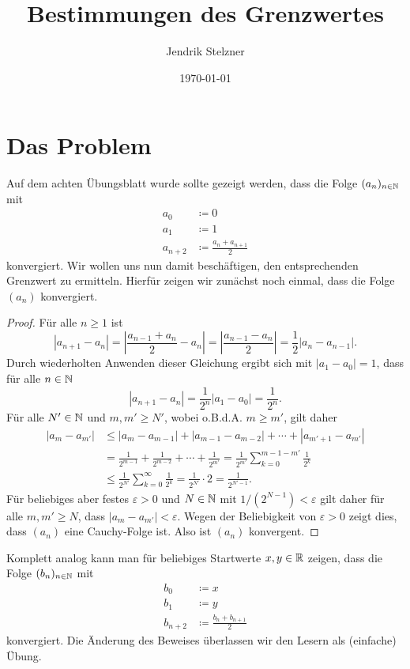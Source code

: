 \documentclass[a4paper,10pt]{article}
\title{Bestimmungen des Grenzwertes}
\author{Jendrik Stelzner}
\date{\today}
\begin{document}
\maketitle

\tableofcontents





\section{Das Problem}


Auf dem achten Übungsblatt wurde sollte gezeigt werden, dass die Folge $(a_n)_{n \in \mathbb{N}}$ mit
\begin{align*}
 a_0 &\coloneqq 0 \\
 a_1 &\coloneqq 1 \\
 a_{n+2} &\coloneqq \frac{a_n + a_{n+1}}{2}
\end{align*}
konvergiert. Wir wollen uns nun damit beschäftigen, den entsprechenden Grenzwert zu ermitteln. Hierfür zeigen wir zunächst noch einmal, dass die Folge $(a_n)$ konvergiert.


\begin{proof}
 Für alle $n \geq 1$ ist
 \[
  |a_{n+1}-a_n|
  = \left| \frac{a_{n-1} + a_n}{2} - a_n \right|
  = \left| \frac{a_{n-1} - a_n}{2} \right|
  = \frac{1}{2} |a_n-a_{n-1}|.
 \]
 Durch wiederholten Anwenden dieser Gleichung ergibt sich mit $|a_1 - a_0| = 1$, dass für alle $n \in \mathbb{N}$
 \[
  |a_{n+1} - a_n| = \frac{1}{2^n}|a_1 - a_0| = \frac{1}{2^n}.
 \]
 Für alle $N' \in \mathbb{N}$ und $m, m' \geq N'$, wobei o.B.d.A. $m \geq m'$, gilt daher
 \begin{align*}
  |a_m - a_{m'}|
  &\leq |a_m - a_{m-1}| + |a_{m-1} - a_{m-2}| + \dotsb + |a_{m'+1} - a_{m'}| \\
  &= \frac{1}{2^{m-1}} + \frac{1}{2^{m-2}} + \dotsb + \frac{1}{2^{m'}}
  = \frac{1}{2^{m'}} \sum_{k=0}^{m-1-m'} \frac{1}{2^k} \\
  &\leq \frac{1}{2^{N'}} \sum_{k=0}^\infty \frac{1}{2^k}
  = \frac{1}{2^{N'}} \cdot 2
  = \frac{1}{2^{N'-1}}.
 \end{align*}
 Für beliebiges aber festes $\varepsilon > 0$ und $N \in \mathbb{N}$ mit $1/(2^{N-1}) < \varepsilon$ gilt daher für alle $m, m' \geq N$, dass $|a_m - a_{m'}| < \varepsilon$. Wegen der Beliebigkeit von $\varepsilon > 0$ zeigt dies, dass $(a_n)$ eine Cauchy-Folge ist. Also ist $(a_n)$ konvergent.
\end{proof}


Komplett analog kann man für beliebiges Startwerte $x,y \in \mathbb{R}$ zeigen, dass die Folge $(b_n)_{n \in \mathbb{N}}$ mit
\begin{align*}
 b_0 &\coloneqq x \\
 b_1 &\coloneqq y \\
 b_{n+2} &\coloneqq \frac{b_n + b_{n+1}}{2}
\end{align*}
konvergiert. Die Änderung des Beweises überlassen wir den Lesern als (einfache) Übung.
\end{document}
